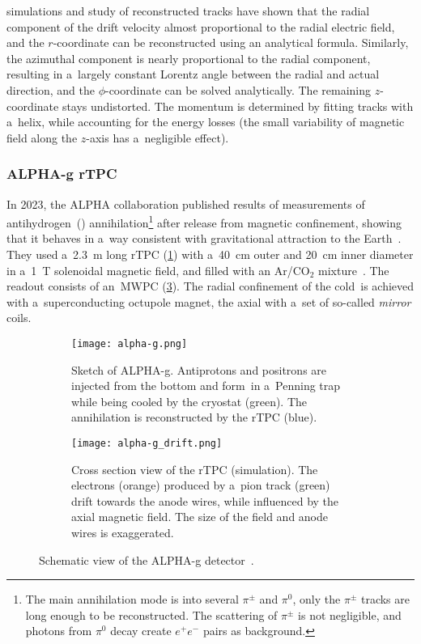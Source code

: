 				\garfieldpp simulations and study of reconstructed tracks have shown that the radial component of the drift velocity almost proportional to the radial electric field, and the $r$\nobreakdash-coordinate can be reconstructed using an analytical formula. Similarly, the azimuthal component is nearly proportional to the radial component, resulting in a~largely constant Lorentz angle between the radial and actual direction, and the $\phi$\nobreakdash-coordinate can be solved analytically. The remaining $z$\nobreakdash-coordinate stays undistorted. The momentum is determined by fitting tracks with a~helix, while accounting for the energy losses (the small variability of magnetic field along the $z$\nobreakdash-axis has a~negligible effect).
				
			\subsubsection{ALPHA-g rTPC}
				In 2023, the \acf{ALPHA} collaboration published results of measurements of antihydrogen~(\antiH) annihilation\footnote{The main \antip annihilation mode is into several $\pi^\pm$ and $\pi^0$, only the $\pi^\pm$ tracks are long enough to be reconstructed. The scattering of $\pi^\pm$ is not negligible, and photons from $\pi^0$ decay create $e^+e^-$ pairs as background.} after release from magnetic confinement, showing that it behaves in a~way consistent with gravitational attraction to the Earth~\cite{alpha_nature}. They used a~\qty{2.3}{m} long \ac{rTPC} (\cref{fig:alpha-g}) with a~\qty{40}{cm} outer and \qty{20}{cm} inner diameter in a~\qty{1}{\tesla} solenoidal magnetic field, and filled with an Ar/CO$_2$ mixture~\cite{alpha_rtpc}. The readout consists of an~\ac{MWPC} (\cref{fig:alpha-g_drift}). The radial confinement of the cold~\antiH is achieved with a~superconducting octupole magnet, the axial with a~set of so\nobreakdash-called \emph{mirror} coils.
				
				\begin{figure}
					\centering
					\begin{subfigure}[t]{0.49\textwidth}
						\centering
						\texttt{[image: alpha-g.png]}
						\caption{Sketch of \acs{ALPHA}\protect\nobreakdash-g. Antiprotons and positrons are injected from the bottom and form~\antiH in a~Penning trap while being cooled by the cryostat (green). The annihilation is reconstructed by the \ac{rTPC} (blue).}
						\label{fig:alpha-g}
					\end{subfigure}
					\hfill
					\begin{subfigure}[t]{0.49\textwidth}
						\centering
						\texttt{[image: alpha-g\_drift.png]}
						\caption{Cross section view of the \ac{rTPC} (\garfieldpp simulation). The electrons (orange) produced by a~pion track (green) drift towards the anode wires, while influenced by the axial magnetic field. The size of the field and anode wires is exaggerated.}
						\label{fig:alpha-g_drift}
					\end{subfigure}
					\caption{Schematic view of the \acs{ALPHA}\protect\nobreakdash-g detector~\cite{alpha_rtpc}.}
				\end{figure}
				
